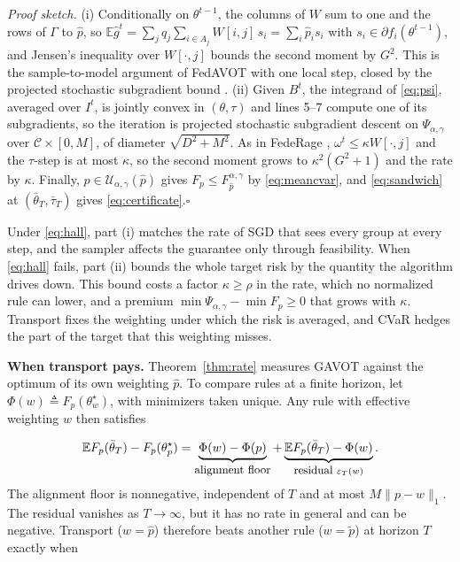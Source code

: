 \documentclass{article}
\theoremstyle{definition}
\newcommand{\E}{\mathbb{E}}
\newcommand{\Uset}{\mathcal{U}_{\alpha,\gamma}}
\newcommand{\avot}{\textsf{GAVOT}}
\begin{document}
\noindent\emph{Proof sketch.} (i) Conditionally on $\theta^{t-1}$, the
columns of $W$ sum to one and the rows of $\Gamma$ to $\hat p$, so
$\E\hat g^t=\sum_jq_j\sum_{i\in A_j}W[i,j]\,s_i=\sum_i\hat p_is_i$ with
$s_i\in\partial f_i(\theta^{t-1})$, and Jensen's inequality over
$W[\cdot,j]$ bounds the second moment by $G^2$. This is the
sample-to-model argument of \textsf{FedAVOT}
\cite[Lemma~1, Thm.~3]{rahimi2025fedavot} with one local step, closed by
the projected stochastic subgradient bound \cite{nemirovski2009}.
(ii) Given $B^t$, the integrand of \eqref{eq:psi}, averaged over $I^t$, is
jointly convex in $(\theta,\tau)$ and lines 5--7 compute one of its
subgradients, so the iteration is projected stochastic subgradient descent
on $\Psi_{\alpha,\gamma}$ over $\mathcal{C}\times[0,M]$, of diameter
$\sqrt{D^2+M^2}$. As in \textsf{FedeRage}
\cite[Thm.~2]{rahimi2026federage}, $\omega^t\le\kappa W[\cdot,j]$ and the
$\tau$-step is at most $\kappa$, so the second moment grows to
$\kappa^2(G^2+1)$ and the rate by $\kappa$. Finally, $p\in\Uset(\hat p)$
gives $F_p\le F^{\alpha,\gamma}_{\hat p}$ by \eqref{eq:meancvar}, and
\eqref{eq:sandwich} at $(\bar\theta_T,\bar\tau_T)$ gives
\eqref{eq:certificate}.\hfill$\square$

Under \eqref{eq:hall}, part (i) matches the rate of SGD that sees every
group at every step, and the sampler affects the guarantee only through
feasibility. When \eqref{eq:hall} fails, part (ii) bounds the whole target
risk by the quantity the algorithm drives down. This bound costs a factor
$\kappa\ge\rho$ in the rate, which no normalized rule can lower, and a
premium $\min\Psi_{\alpha,\gamma}-\min F_p\ge0$ that grows with $\kappa$.
Transport fixes the weighting under which the risk is averaged, and CVaR
hedges the part of the target that this weighting misses.


\noindent\textbf{When transport pays.} Theorem~\ref{thm:rate} measures
\avot{} against the optimum of its own weighting $\hat p$. To compare
rules at a finite horizon, let $\Phi(w)\triangleq F_p(\theta^\star_w)$,
with minimizers taken unique. Any rule with effective weighting $w$ then
satisfies\vspace{-8pt}

\begin{equation}
\E F_p(\bar\theta_T)-F_p(\theta^\star_p)
=\underbrace{\Phi(w)-\Phi(p)}_{\textnormal{\small alignment floor}}
+\underbrace{\E F_p(\bar\theta_T)-\Phi(w)}_{\textnormal{\small residual }\varepsilon_T(w)}.
\label{eq:infeasible}
\end{equation}
The alignment floor is nonnegative, independent of $T$ and at most
$M\|p-w\|_1$. The residual vanishes as $T\to\infty$, but it has no rate in
general and can be negative. Transport ($w=\hat p$) therefore beats
another rule ($w=\tilde p$) at horizon $T$ exactly when\vspace{-8pt}
\end{document}
